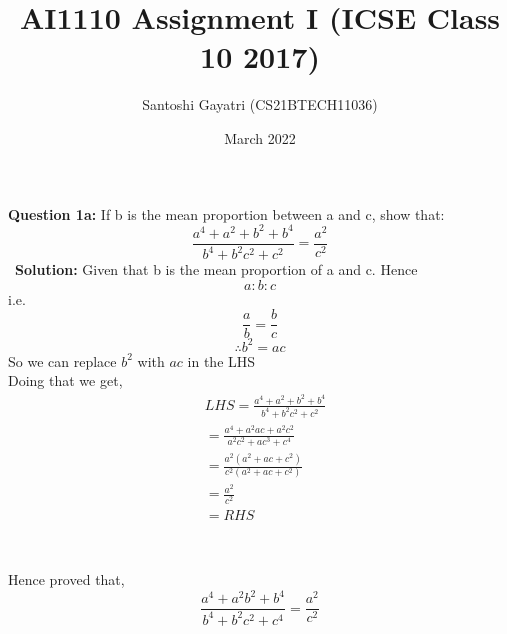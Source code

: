 \documentclass[journal,12pt,twocolumn]{IEEEtran}
\title{AI1110 Assignment I (ICSE Class 10 2017)}
\author{Santoshi Gayatri (CS21BTECH11036)}
\date{March 2022}
\begin{document}
\maketitle
\textbf {Question 1a:}
If b is the mean proportion between a and c, show that:
$$ \frac{ a^4 + a^2+b^2 + b^4}{b^4 + b^2c^2 + c^2}=\frac{a^2}{c^2}$$\
\textbf{Solution:}
Given that b is the mean proportion of a and c. Hence $$a:b:c$$
i.e. $${\frac{a}{b}=\frac{b}{c} }$$
$${\therefore  b^{2}=ac}$$
So we can replace $b^2$ with $ac$ in the LHS\\
Doing that we get,
\begin{align}
&{LHS = \frac{ a^4 + a^2+b^2 + b^4}{b^4 + b^2c^2 + c^2}}\\[8pt]
&{ = \frac{ a^4 + a^2ac + a^2c^2}{ a^2c^2 + ac^3 + c ^4}}\\[8pt]
&{ = \frac{a^2(a^2 + ac + c^2)}{c^2(a^2 + ac + c^2)}}\\[8pt]
&{ = \frac{a^2}{c^2}}\\[8pt]
&=RHS
\end{align}
\begin{center}
\\
\end{center}
Hence proved that,
\begin{equation}
{\frac{ a^4 + a^2b^2 + b^4}{b^4 + b^2c^2 + c^4}=\frac{a^2}{c^2}}
\end{equation}
\end{document}

